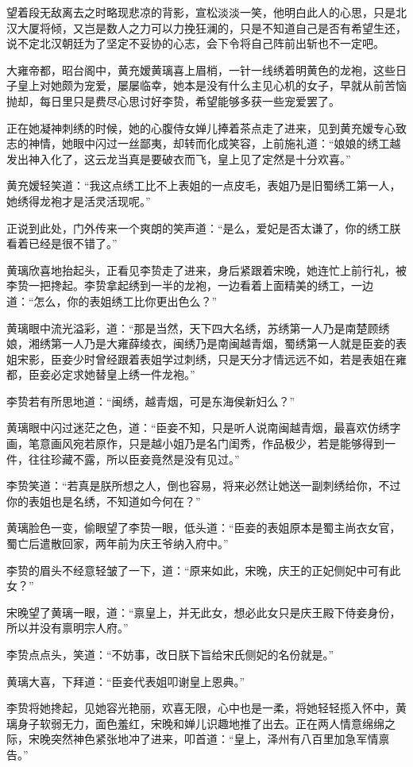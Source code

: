 望着段无敌离去之时略现悲凉的背影，宣松淡淡一笑，他明白此人的心思，只是北汉大厦将倾，又岂是数人之力可以力挽狂澜的，只是不知道自己是否有希望生还，说不定北汉朝廷为了坚定不妥协的心志，会下令将自己阵前出斩也不一定吧。

大雍帝都，昭台阁中，黄充嫒黄璃喜上眉梢，一针一线绣着明黄色的龙袍，这些日子皇上对她颇为宠爱，屡屡临幸，她本是没有什么主见心机的女子，早就从前苦恼抛却，每日里只是费尽心思讨好李贽，希望能够多获一些宠爱罢了。

正在她凝神刺绣的时候，她的心腹侍女婵儿捧着茶点走了进来，见到黄充嫒专心致志的神情，她眼中闪过一丝鄙夷，却转而化成笑容，上前施礼道：“娘娘的绣工越发出神入化了，这云龙当真是要破衣而飞，皇上见了定然是十分欢喜。”

黄充嫒轻笑道：“我这点绣工比不上表姐的一点皮毛，表姐乃是旧蜀绣工第一人，她绣得龙袍才是活灵活现呢。”

正说到此处，门外传来一个爽朗的笑声道：“是么，爱妃是否太谦了，你的绣工朕看着已经是很不错了。”

黄璃欣喜地抬起头，正看见李贽走了进来，身后紧跟着宋晚，她连忙上前行礼，被李贽一把搀起。李贽拿起绣到一半的龙袍，一边看着上面精美的绣工，一边道：“怎么，你的表姐绣工比你更出色么？”

黄璃眼中流光溢彩，道：“那是当然，天下四大名绣，苏绣第一人乃是南楚顾绣娘，湘绣第一人乃是大雍薛绫衣，闽绣乃是南闽越青烟，蜀绣第一人就是臣妾的表姐宋影，臣妾少时曾经跟着表姐学过刺绣，只是天分才情远远不如，若是表姐在雍都，臣妾必定求她替皇上绣一件龙袍。”

李贽若有所思地道：“闽绣，越青烟，可是东海侯新妇么？”

黄璃眼中闪过迷茫之色，道：“臣妾不知，只是听人说南闽越青烟，最喜欢仿绣字画，笔意画风宛若原作，只是越小姐乃是名门闺秀，作品极少，若是能够得到一件，往往珍藏不露，所以臣妾竟然是没有见过。”

李贽笑道：“若真是朕所想之人，倒也容易，将来必然让她送一副刺绣给你，不过你的表姐也是名绣，不知道如今何在？”

黄璃脸色一变，偷眼望了李贽一眼，低头道：“臣妾的表姐原本是蜀主尚衣女官，蜀亡后遣散回家，两年前为庆王爷纳入府中。”

李贽的眉头不经意轻皱了一下，道：“原来如此，宋晚，庆王的正妃侧妃中可有此女？”

宋晚望了黄璃一眼，道：“禀皇上，并无此女，想必此女只是庆王殿下侍妾身份，所以并没有禀明宗人府。”

李贽点点头，笑道：“不妨事，改日朕下旨给宋氏侧妃的名份就是。”

黄璃大喜，下拜道：“臣妾代表姐叩谢皇上恩典。”

李贽将她搀起，见她容光艳丽，欢喜无限，心中也是一柔，将她轻轻揽入怀中，黄璃身子软弱无力，面色羞红，宋晚和婵儿识趣地推了出去。正在两人情意绵绵之际，宋晚突然神色紧张地冲了进来，叩首道：“皇上，泽州有八百里加急军情禀告。”

